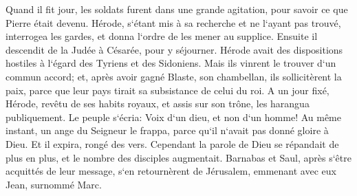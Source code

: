 \verse Quand il fit jour, les soldats furent dans une grande agitation, pour savoir ce que Pierre était devenu. 
\verse Hérode, s`étant mis à sa recherche et ne l`ayant pas trouvé, interrogea les gardes, et donna l`ordre de les mener au supplice. Ensuite il descendit de la Judée à Césarée, pour y séjourner. 
\verse Hérode avait des dispositions hostiles à l`égard des Tyriens et des Sidoniens. Mais ils vinrent le trouver d`un commun accord; et, après avoir gagné Blaste, son chambellan, ils sollicitèrent la paix, parce que leur pays tirait sa subsistance de celui du roi. 
\verse A un jour fixé, Hérode, revêtu de ses habits royaux, et assis sur son trône, les harangua publiquement. 
\verse Le peuple s`écria: Voix d`un dieu, et non d`un homme! 
\verse Au même instant, un ange du Seigneur le frappa, parce qu`il n`avait pas donné gloire à Dieu. Et il expira, rongé des vers. 
\verse Cependant la parole de Dieu se répandait de plus en plus, et le nombre des disciples augmentait. 
\verse Barnabas et Saul, après s`être acquittés de leur message, s`en retournèrent de Jérusalem, emmenant avec eux Jean, surnommé Marc. 

